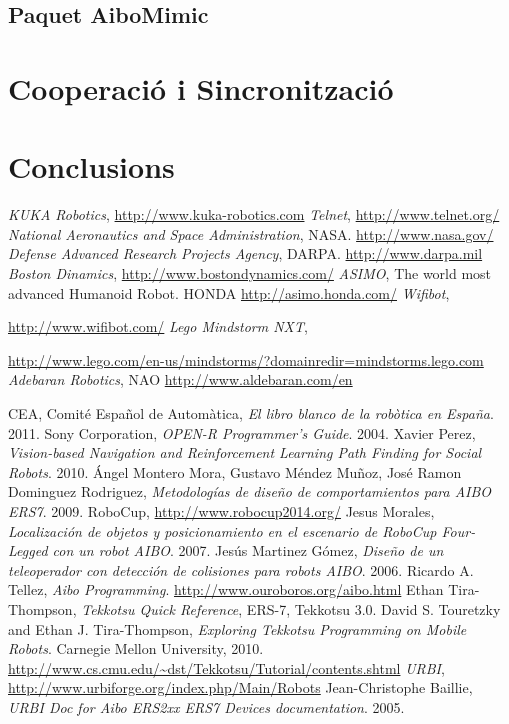 \documentclass[12pt,a4paper,final,twoside]{article}
\begin{document}
\subsection{Paquet AiboMimic}
\section{Cooperació i Sincronització}
\section*{Conclusions}




\newpage
\clearpage
{}
\begin{thebibliography}{99}
	\emph{KUKA Robotics},
	\url{http://www.kuka-robotics.com}
	\emph{Telnet},
	\url{http://www.telnet.org/}
	\emph{National Aeronautics and Space Administration},
	NASA.
	\url{http://www.nasa.gov/}
	\emph{Defense Advanced Research Projects Agency},
	DARPA.
	\url{http://www.darpa.mil}
	\emph{Boston Dinamics},
	\url{http://www.bostondynamics.com/}
	\emph{ASIMO}, 
	The world most advanced Humanoid Robot.
	HONDA
	\url{http://asimo.honda.com/}
	\emph{Wifibot}, 
	
	\url{http://www.wifibot.com/}
	\emph{Lego Mindstorm NXT}, 
	
	\url{http://www.lego.com/en-us/mindstorms/?domainredir=mindstorms.lego.com}
	\emph{Adebaran Robotics},
	NAO
	\url{http://www.aldebaran.com/en}

	CEA, Comité Español de Automàtica,
	\emph{El libro blanco de la robòtica en España}.
	2011.
  Sony Corporation,
  \emph{OPEN-R Programmer's Guide}.
  2004.
	Xavier Perez,
	\emph{Vision-based Navigation and Reinforcement Learning Path Finding for Social Robots}.
	2010.
	Ángel Montero Mora, Gustavo Méndez Muñoz, José Ramon Dominguez Rodriguez,
	\emph{Metodologías de diseño de comportamientos para AIBO ERS7}.
	2009.
	RoboCup, \url{http://www.robocup2014.org/}
	Jesus Morales,
	\emph{Localización de objetos y posicionamiento en el escenario de RoboCup Four-Legged con un robot AIBO}.
	2007.  
	Jesús Martinez Gómez, 
	\emph{Diseño de un teleoperador con detección de colisiones para robots AIBO}. 			2006.
	Ricardo A. Tellez,
	\emph{Aibo Programming}.
	\url{http://www.ouroboros.org/aibo.html}
	Ethan Tira-Thompson,
	\emph{Tekkotsu Quick Reference}, ERS-7, Tekkotsu 3.0.
	David S. Touretzky and Ethan J. Tira-Thompson, 
	\emph{Exploring Tekkotsu Programming on Mobile Robots}.
	Carnegie Mellon University,
	2010.
	\url{http://www.cs.cmu.edu/~dst/Tekkotsu/Tutorial/contents.shtml}
	\emph{URBI},
	\url{http://www.urbiforge.org/index.php/Main/Robots}
	Jean-Christophe Baillie,
	\emph{URBI Doc for Aibo ERS2xx ERS7 Devices documentation}.
	2005.
	
\end{thebibliography}
\end{document}

